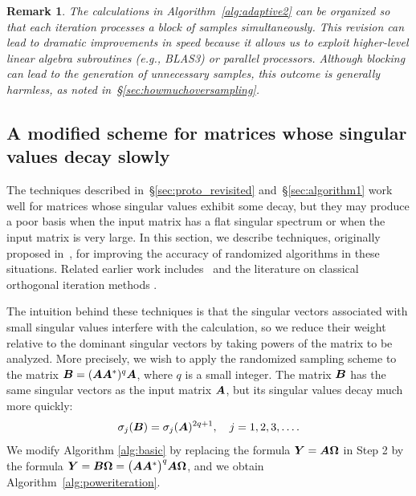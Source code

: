 \documentclass[final]{siamltex}
\newcounter{algorithm}[section]
\newtheorem{remark}{Remark}[section]
\begin{document}
\lsp

\begin{remark}\rm
The calculations in Algorithm~\ref{alg:adaptive2} can be organized so that
each iteration processes a block of samples simultaneously.  This revision
can lead to dramatic improvements in speed because it allows us to exploit
higher-level linear algebra subroutines (e.g., BLAS3) or parallel processors.
Although blocking can lead to the generation of unnecessary samples, this
outcome is generally harmless, as noted in~\S\ref{sec:howmuchoversampling}.
\end{remark}

\subsection{A modified scheme for matrices whose singular values decay slowly}
\label{sec:powerscheme}

The techniques described in~\S\ref{sec:proto_revisited} and~\S\ref{sec:algorithm1}
work well for matrices whose singular values exhibit some decay,
but they may produce a poor basis when the input matrix has a flat singular spectrum
or when the input matrix is very large. In this section, we describe techniques,
originally proposed in~\cite{Gu-personal,tygert_szlam}, for improving the accuracy
of randomized algorithms in these situations.
Related earlier work includes~\cite{roweis} and the literature on
classical orthogonal iteration methods \cite[p.~332]{golub}.

The intuition behind these techniques is that
the singular vectors associated with small singular values
interfere with the calculation, so we reduce their weight relative to
the dominant singular vectors by taking powers of the matrix to be analyzed.
More precisely, we wish to apply the randomized sampling scheme
to the matrix $\bm{B} = (\bm{A}\bm{A}^*)^q \bm{A}$, where $q$ is a
small integer.  The matrix $\bm{B}$ has the same singular vectors as
the input matrix $\bm{A}$, but its singular values decay much more quickly:
\begin{equation}
\label{eq:svds_of_B}
\sigma_j( \mtx{B} ) = \sigma_j( \mtx{A} )^{2q+1},
\quad j = 1, 2, 3, \dots.
\end{equation}
We modify Algorithm \ref{alg:basic} by replacing the formula $\bm{Y} = \bm{A}\bm{\Omega}$
in Step 2 by the formula
$\bm{Y} = \bm{B}\bm{\Omega} = \bigl(\bm{A}\bm{A}^{*}\bigr)^{q}\bm{A}\bm{\Omega}$,
and we obtain Algorithm~\ref{alg:poweriteration}.
\end{document}
